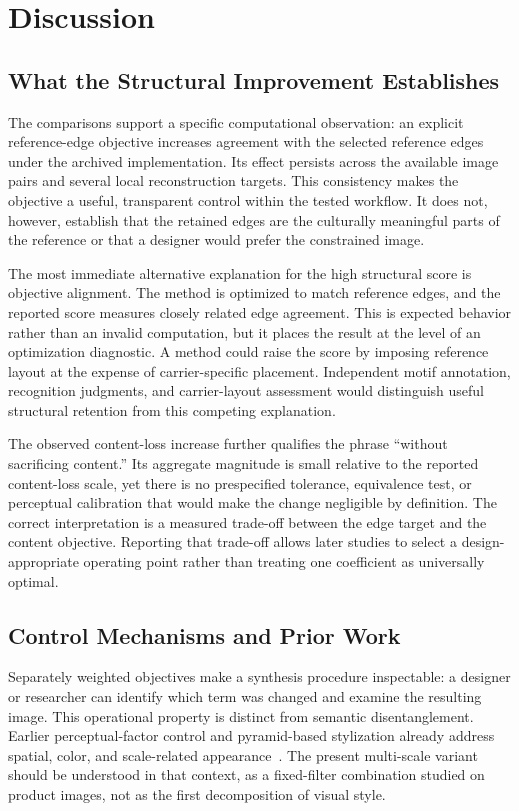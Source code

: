 \section{Discussion}
\label{sec:discussion}

\subsection{What the Structural Improvement Establishes}
The comparisons support a specific computational observation: an explicit reference-edge objective increases agreement with the selected reference edges under the archived implementation. Its effect persists across the available image pairs and several local reconstruction targets. This consistency makes the objective a useful, transparent control within the tested workflow. It does not, however, establish that the retained edges are the culturally meaningful parts of the reference or that a designer would prefer the constrained image.

The most immediate alternative explanation for the high structural score is objective alignment. The method is optimized to match reference edges, and the reported score measures closely related edge agreement. This is expected behavior rather than an invalid computation, but it places the result at the level of an optimization diagnostic. A method could raise the score by imposing reference layout at the expense of carrier-specific placement. Independent motif annotation, recognition judgments, and carrier-layout assessment would distinguish useful structural retention from this competing explanation.

The observed content-loss increase further qualifies the phrase ``without sacrificing content.'' Its aggregate magnitude is small relative to the reported content-loss scale, yet there is no prespecified tolerance, equivalence test, or perceptual calibration that would make the change negligible by definition. The correct interpretation is a measured trade-off between the edge target and the content objective. Reporting that trade-off allows later studies to select a design-appropriate operating point rather than treating one coefficient as universally optimal.

\subsection{Control Mechanisms and Prior Work}
Separately weighted objectives make a synthesis procedure inspectable: a designer or researcher can identify which term was changed and examine the resulting image. This operational property is distinct from semantic disentanglement. Earlier perceptual-factor control and pyramid-based stylization already address spatial, color, and scale-related appearance~\cite{gatys2017control,lapstyle2021}. The present multi-scale variant should be understood in that context, as a fixed-filter combination studied on product images, not as the first decomposition of visual style.

